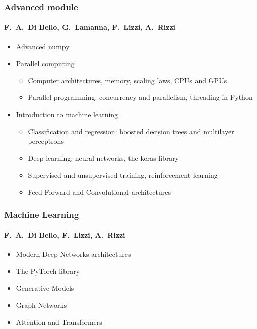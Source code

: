 \documentclass[9pt]{beamer}
\begin{document}
\begin{frame}
  \frametitle{Advanced module}
  \framesubtitle{F.~A.~Di Bello, G.~Lamanna, F.~Lizzi, A.~Rizzi}
  \begin{itemize}
  \item Advanced numpy
  \item Parallel computing
    \begin{itemize}
    \item Computer architectures, memory, scaling laws, CPUs and GPUs
    \item Parallel programming: concurrency and parallelism, threading in Python
    \end{itemize}
  \item Introduction to machine learning
    \begin{itemize}
    \item Classification and regression: boosted decision trees and
      multilayer perceptrons
    \item Deep learning: neural networks, the keras library
    \item Supervised and unsupervised training, reinforcement learning
    \item Feed Forward and Convolutional architectures
    \end{itemize}
  \end{itemize}
\end{frame}


\begin{frame}
  \frametitle{Machine Learning}
  \framesubtitle{F.~A.~Di Bello, F.~Lizzi, A.~Rizzi}
  \begin{itemize}
    \item Modern Deep Networks architectures
    \item The PyTorch library
    \item Generative Models
    \item Graph Networks
    \item Attention and Transformers
  \end{itemize}
\end{frame}
\end{document}
